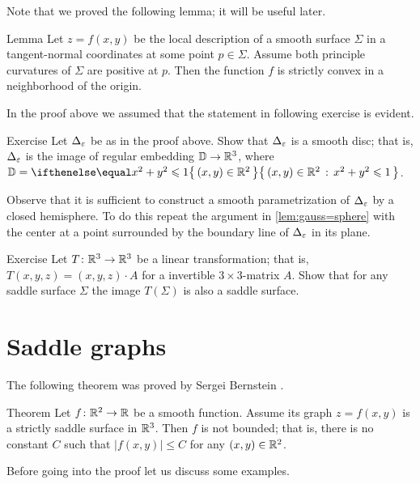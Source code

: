 Note that we proved the following lemma; it will be useful later. %

\begin{thm}{Lemma}\label{lem:gauss+=>convexity}
Let $z=f(x,y)$ be the local description of a smooth surface $\Sigma$ in a tangent-normal coordinates at some point $p\in\Sigma$.
Assume both principle curvatures of $\Sigma$ are positive at $p$.
Then the function $f$ is strictly convex in a neighborhood of the origin.
\end{thm}

In the proof above we assumed that the statement in following exercise is evident.

\begin{thm}{Exercise}\label{ex:disc-hat}
Let $\Delta_\varepsilon$ be as in the proof above.
Show that $\Delta_\varepsilon$ is a smooth disc; that is, $\Delta_\varepsilon$ is the image of regular embedding $\mathbb{D}\to \mathbb{R}^3$, where $\DD=\set{(x,y)\in\RR^2}{x^2+y^2\le 1}$.
\end{thm}

 Observe that it is sufficient to construct a smooth parametrization of $\Delta_\varepsilon$ by a closed hemisphere.
To do this repeat the argument in \ref{lem:gauss=sphere} with the center at a point surrounded by the boundary line of $\Delta_\varepsilon$ in its plane.

\begin{thm}{Exercise}\label{ex:saddle-linear}
Let $T\colon\mathbb{R}^3\to\mathbb{R}^3$ be a linear transformation; that is, $T(x,y,z)=(x,y,z)\cdot A$ for a invertible $3{\times}3$-matrix $A$. 
Show that for any saddle surface $\Sigma$ the image $T(\Sigma)$ is also a saddle surface.
\end{thm}

\section*{Saddle graphs}

The following theorem was proved by Sergei Bernstein \cite{bernstein}.

\begin{thm}{Theorem}\label{thm:bernshtein}
Let $f\colon\mathbb{R}^2\to\mathbb{R}$ be a smooth function.
Assume its graph $z=f(x,y)$ is a strictly saddle surface in $\mathbb{R}^3$.
Then $f$ is not bounded;
that is, there is no constant $C$ such that 
$|f(x,y)|\le C$ for any $(x,y)\in\mathbb{R}^2$.
\end{thm}

Before going into the proof let us discuss some examples.

